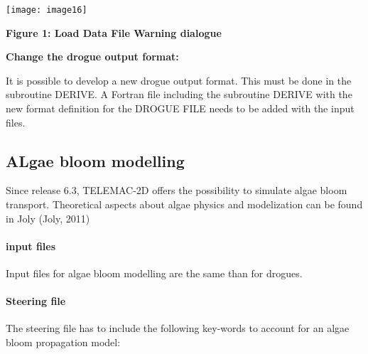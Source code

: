 \documentclass{article} %
\begin{document}
 \texttt{[image: image16]}

 \textbf{Figure 1: Load Data File Warning dialogue}

 \textbf{                    Change the drogue output format:}

 It is possible to develop a new drogue output format. This must be done in the subroutine DERIVE. A Fortran file including the subroutine DERIVE with the new format definition for the DROGUE FILE needs to be added with the input files.


\subsection{ ALgae bloom modelling}

 Since release 6.3, TELEMAC-2D offers the possibility to simulate algae bloom transport. Theoretical aspects about algae physics and modelization can be found in Joly (Joly, 2011)


\paragraph{ input files}

 Input files for algae bloom modelling are the same than for drogues.


\paragraph{ Steering file}

 The steering file has to include the following key-words to account for an algae bloom propagation model:
\end{document}

